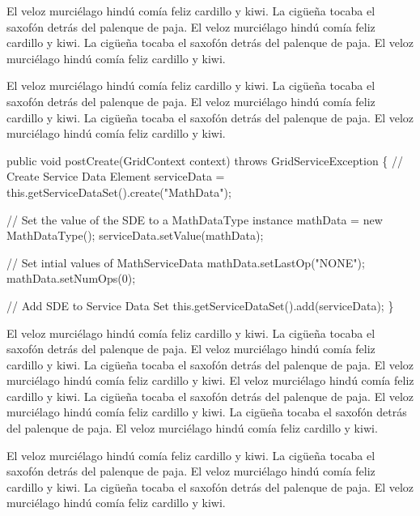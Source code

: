 El veloz murciélago hindú comía feliz cardillo y kiwi.  La cigüeña tocaba el saxofón detrás del palenque de paja.  El veloz murciélago hindú comía feliz cardillo y kiwi.  La cigüeña tocaba el saxofón detrás del palenque de paja.  El veloz murciélago hindú comía feliz cardillo y kiwi.


El veloz murciélago hindú comía feliz cardillo y kiwi.  La cigüeña tocaba el saxofón detrás del palenque de paja.  El veloz murciélago hindú comía feliz cardillo y kiwi.  La cigüeña tocaba el saxofón detrás del palenque de paja.  El veloz murciélago hindú comía feliz cardillo y kiwi.

\begin{codigo}
public void postCreate(GridContext context) throws GridServiceException
\{
    // Create Service Data Element
    serviceData = this.getServiceDataSet().create("MathData");

    // Set the value of the SDE to a MathDataType instance
    mathData = new MathDataType();
    serviceData.setValue(mathData);

    // Set intial values of MathServiceData
    mathData.setLastOp("NONE");
    mathData.setNumOps(0);

    // Add SDE to Service Data Set
    this.getServiceDataSet().add(serviceData);
\}
\end{codigo}

El veloz murciélago hindú comía feliz cardillo y kiwi.  La cigüeña tocaba el saxofón detrás del palenque de paja.  El veloz murciélago hindú comía feliz cardillo y kiwi.  La cigüeña tocaba el saxofón detrás del palenque de paja.  El veloz murciélago hindú comía feliz cardillo y kiwi. El veloz murciélago hindú comía feliz cardillo y kiwi.  La cigüeña tocaba el saxofón detrás del palenque de paja.  El veloz murciélago hindú comía feliz cardillo y kiwi.  La cigüeña tocaba el saxofón detrás del palenque de paja.  El veloz murciélago hindú comía feliz cardillo y kiwi.


El veloz murciélago hindú comía feliz cardillo y kiwi.  La cigüeña tocaba el saxofón detrás del palenque de paja.  El veloz murciélago hindú comía feliz cardillo y kiwi.  La cigüeña tocaba el saxofón detrás del palenque de paja.  El veloz murciélago hindú comía feliz cardillo y kiwi.

